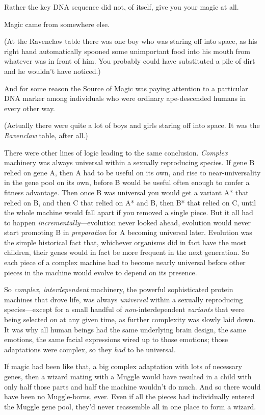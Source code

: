 Rather the key DNA sequence did not, of itself, give you your magic at all.

Magic came from somewhere else.

(At the Ravenclaw table there was one boy who was staring off into space, as his right hand automatically spooned some unimportant food into his mouth from whatever was in front of him. You probably could have substituted a pile of dirt and he wouldn't have noticed.)

And for some reason the Source of Magic was paying attention to a particular DNA marker among individuals who were ordinary ape-descended humans in every other way.

(Actually there were quite a lot of boys and girls staring off into space. It was the \emph{Ravenclaw} table, after all.)

There were other lines of logic leading to the same conclusion. \emph{Complex} machinery was always universal within a sexually reproducing species. If gene B relied on gene A, then A had to be useful on its own, and rise to near-universality in the gene pool on its own, before B would be useful often enough to confer a fitness advantage. Then once B was universal you would get a variant A* that relied on B, and then C that relied on A* and B, then B* that relied on C, until the whole machine would fall apart if you removed a single piece. But it all had to happen \emph{incrementally}—evolution never looked ahead, evolution would never start promoting B in \emph{preparation} for A becoming universal later. Evolution was the simple historical fact that, whichever organisms did in fact have the most children, their genes would in fact be more frequent in the next generation. So each piece of a complex machine had to become nearly universal before other pieces in the machine would evolve to depend on its presence.

So \emph{complex, interdependent} machinery, the powerful sophisticated protein machines that drove life, was always \emph{universal} within a sexually reproducing species—except for a small handful of \emph{non}-interdependent \emph{variants} that were being selected on at any given time, as further complexity was slowly laid down. It was why all human beings had the same underlying brain design, the same emotions, the same facial expressions wired up to those emotions; those adaptations were complex, so they \emph{had} to be universal.

If magic had been like that, a big complex adaptation with lots of necessary genes, then a wizard mating with a Muggle would have resulted in a child with only half those parts and half the machine wouldn't do much. And so there would have been no Muggle-borns, ever. Even if all the pieces had individually entered the Muggle gene pool, they'd never reassemble all in one place to form a wizard.

